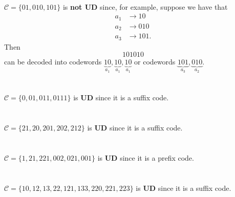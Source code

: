 \documentclass[
  coursecode={MTHE 474},
  assignmentname={Homework \homeworknumber},
  studentnumber=20053722,
  name={Bryan Hoang},
  draft,
]{
  ltxanswer%
}
\begin{document}
  \begin{questions}
    \setcounter{question}{\questionnumber}
    \addtocounter{question}{-1}
    \question[10]\
    \begin{parts}
      \part{}
      \begin{solution}
        \(\mathcal{C}=\{01,010,101\}\) is \textbf{not UD} since, for example, suppose we have that
        \begin{align*}
          a_{1} &\to 10   \\
          a_{2} &\to 010  \\
          a_{3} &\to 101.
        \end{align*}
        Then
        \begin{equation*}
          101010
        \end{equation*}
        can be decoded into codewords \(\underbrace{10}_{a_{1}},\underbrace{10}_{a_{1}},\underbrace{10}_{a_{1}}\) or codewords \(\underbrace{101}_{a_{3}},\underbrace{010}_{a_{2}}\).
      \end{solution}

      \part{}
      \begin{solution}
        \(\mathcal{C}=\{0,01,011,0111\}\) is \textbf{UD} since it is a suffix code.
      \end{solution}

      \part{}
      \begin{solution}
        \(\mathcal{C}=\{21,20,201,202,212\}\) is \textbf{UD} since it is a suffix code.
      \end{solution}

      \part{}
      \begin{solution}
        \(\mathcal{C}=\{1,21,221,002,021,001\}\) is \textbf{UD} since it is a prefix code.
      \end{solution}

      \part{}
      \begin{solution}
        \(\mathcal{C}=\{10,12,13,22,121,133,220,221,223\}\) is \textbf{UD} since it is a suffix code.
      \end{solution}
    \end{parts}
  \end{questions}
\end{document}
